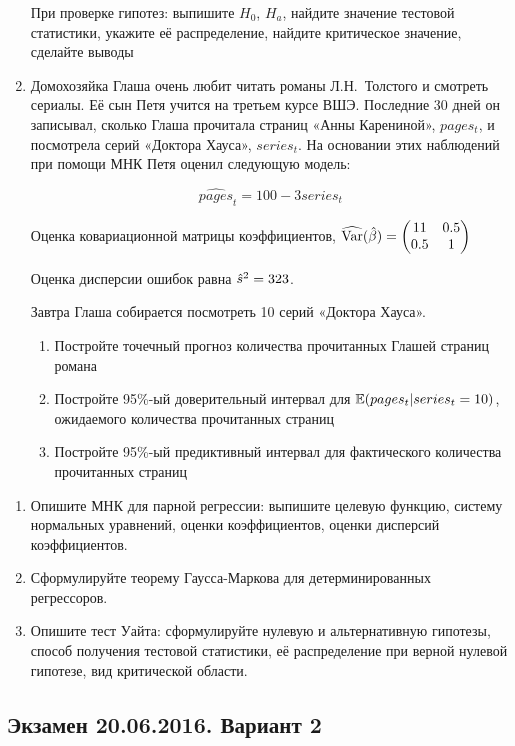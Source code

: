 \documentclass[12pt, a4paper]{article}\usepackage[]{graphicx}\usepackage[]{color}
\begin{document}
\begin{enumerate}
При проверке гипотез: выпишите $H_0$, $H_a$, найдите значение тестовой статистики, укажите её распределение, найдите критическое значение, сделайте выводы


\item Домохозяйка Глаша очень любит читать романы Л.Н.~Толстого и смотреть сериалы. Её сын Петя учится на третьем курсе ВШЭ.  Последние 30 дней он записывал, сколько Глаша прочитала страниц «Анны Карениной», $pages_t$, и посмотрела серий «Доктора Хауса», $series_t$. На основании этих наблюдений при помощи МНК Петя оценил следующую модель:

\[
\widehat{pages}_t=100-3series_t
\]

Оценка ковариационной матрицы коэффициентов,
$\widehat{\operatorname{Var}}(\hat{\beta}) = \begin{pmatrix}
11 & 0.5 \\
0.5 & 1\\
\end{pmatrix}$

Оценка дисперсии ошибок равна $\hat{s}^2=323$.

Завтра Глаша собирается посмотреть 10 серий «Доктора Хауса».

\begin{enumerate}
\item Постройте точечный прогноз количества прочитанных Глашей страниц романа
\item Постройте 95\%-ый доверительный интервал для $\mathbb{E}(pages_t |series_t=10)$, ожидаемого количества прочитанных страниц
\item	Постройте 95\%-ый предиктивный интервал для фактического количества прочитанных страниц
\end{enumerate}


\end{enumerate}


\begin{enumerate}[resume]
\item Опишите МНК для парной регрессии: выпишите целевую функцию, систему нормальных уравнений, оценки коэффициентов, оценки дисперсий коэффициентов.
\item Сформулируйте теорему Гаусса-Маркова для детерминированных регрессоров.
\item Опишите тест Уайта: сформулируйте нулевую и альтернативную гипотезы, способ получения тестовой статистики, её распределение при верной нулевой гипотезе, вид критической области.
\end{enumerate}

\subsection{Экзамен 20.06.2016. Вариант 2}
\end{document}
